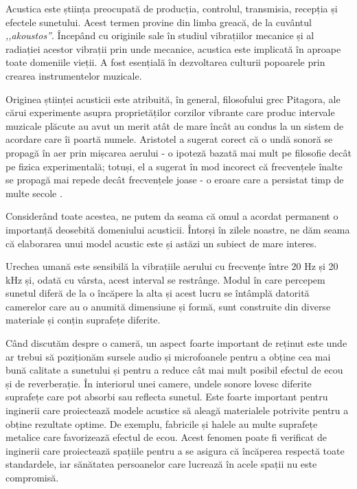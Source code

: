 Acustica este știința preocupată de producția, controlul, transmisia, recepția și efectele sunetului. Acest termen provine din limba greacă, de la cuvântul \textit{,,akoustos''}. Începând cu originile sale în studiul vibrațiilor mecanice și al radiației acestor vibrații prin unde mecanice, acustica este implicată în aproape toate domeniile vieții. A fost esențială în dezvoltarea culturii popoarele prin crearea instrumentelor muzicale.

Originea științei acusticii este atribuită, în general, filosofului grec Pitagora, ale cărui experimente asupra proprietăților corzilor vibrante care produc intervale muzicale plăcute au avut un merit atât de mare încât au condus la un sistem de acordare care îi poartă numele. Aristotel a sugerat corect că o undă sonoră se propagă în aer prin mișcarea aerului - o ipoteză bazată mai mult pe filosofie decât pe fizica experimentală; totuși, el a sugerat în mod incorect că frecvențele înalte se propagă mai repede decât frecvențele joase - o eroare care a persistat timp de multe secole \cite{istorie}.

Considerând toate acestea, ne putem da seama că omul a acordat permanent o importanță deosebită domeniului acusticii. Întorși în zilele noastre, ne dăm seama că elaborarea unui model acustic este și astăzi un subiect de mare interes.

Urechea umană este sensibilă la vibrațiile aerului cu frecvențe între 20 Hz și 20 kHz și, odată cu vârsta, acest interval se restrânge. Modul în care percepem sunetul diferă de la o încăpere la alta și acest lucru se întâmplă datorită camerelor care au o anumită dimensiune și formă, sunt construite din diverse materiale și conțin suprafețe diferite.

Când discutăm despre o cameră, un aspect foarte important de reținut este unde ar trebui să poziționăm sursele audio și microfoanele pentru a obține cea mai bună calitate a sunetului și pentru a reduce cât mai mult posibil efectul de ecou și de reverberație. În interiorul unei camere, undele sonore lovesc diferite suprafețe care pot absorbi sau reflecta sunetul. Este foarte important pentru inginerii care proiectează modele acustice să aleagă materialele potrivite pentru a obține rezultate optime. De exemplu, fabricile și halele au multe suprafețe metalice care favorizează efectul de ecou. Acest fenomen poate fi verificat de inginerii care proiectează spațiile pentru a se asigura că încăperea respectă toate standardele, iar sănătatea persoanelor care lucrează în acele spații nu este compromisă.


